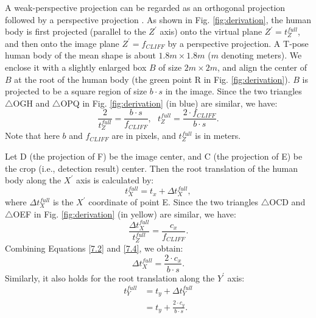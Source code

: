\documentclass[runningheads]{llncs}
\begin{document}
A weak-perspective projection can be regarded as an orthogonal projection followed by a perspective projection \cite{shimshoni1999geometric}.
As shown in Fig. \ref{fig:derivation}, the human body is first projected (parallel to the $Z^{'}$ axis) onto the virtual plane $Z^{'}=t_Z^{full}$, and then onto the image plane $Z^{'}=f_{CLIFF}$ by a perspective projection.
A T-pose human body of the mean shape is about $1.8m \times 1.8m$ ($m$ denoting meters).
We enclose it with a slightly enlarged box $B$ of size $2m \times 2m$, and align the center of $B$ at the root of the human body (the green point R in Fig. \ref{fig:derivation}).
$B$ is projected to be a square region of size $b \cdot s$ in the image.
Since the two triangles $\triangle$OGH and $\triangle$OPQ in Fig. \ref{fig:derivation} (in blue) are similar, we have:
\begin{equation}\tag{7.2}\label{7.2}
	\frac{2}{t_Z^{full}} = \frac{b \cdot s}{f_{CLIFF}}, ~~~
	t_Z^{full} = \frac{2 \cdot f_{CLIFF}}{b \cdot s}.
\end{equation}
Note that here $b$ and $f_{CLIFF}$ are in pixels, and $t_Z^{full}$ is in meters.

Let D (the projection of F) be the image center, and C (the projection of E) be the crop (i.e., detection result) center.
Then the root translation of the human body along the $X^{'}$ axis is calculated by:
\begin{equation}\tag{7.3}
	t_X^{full} = t_x + \Delta t_X^{full},
\end{equation}
where $\Delta t_X^{full}$ is the $X^{'}$ coordinate of point E.
Since the two triangles $\triangle$OCD and $\triangle$OEF in Fig. \ref{fig:derivation} (in yellow) are similar, we have:
\begin{equation}\tag{7.4}\label{7.4}
	\frac{\Delta t_X^{full}}{t_Z^{full}} = \frac{c_x}{f_{CLIFF}}.
\end{equation}
Combining Equations \ref{7.2} and \ref{7.4}, we obtain:
\begin{equation}\tag{7.5}
	\Delta t_X^{full} = \frac{2 \cdot c_x}{b \cdot s}.
\end{equation}
Similarly, it also holds for the root translation along the $Y^{'}$ axis:
\begin{equation}\tag{7.6}\begin{aligned}
	t_Y^{full} & = t_y + \Delta t_Y^{full} \\
			   & = t_y + \frac{2 \cdot c_y}{b \cdot s}.
\end{aligned}\end{equation}
\end{document}
